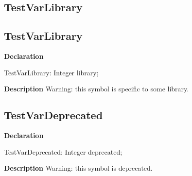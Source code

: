 \documentclass{report}
\newif\ifpdf
\begin{document}
\subsection*{\large{\textbf{TestVarLibrary}}\normalsize\hspace{1ex}\hrulefill}
\else
\subsection*{TestVarLibrary}
\fi
\label{ok_hint_directives-TestVarLibrary}
\begin{list}{}{
\setlength{\itemindent}{0cm}
\setlength{\listparindent}{0cm}
\setlength{\leftmargin}{\evensidemargin}
\addtolength{\leftmargin}{\tmplength}
\settowidth{\labelsep}{X}
\addtolength{\leftmargin}{\labelsep}
\setlength{\labelwidth}{\tmplength}
}
\item[\textbf{Declaration}\hfill]
\ifpdf
\begin{flushleft}
\fi
\begin{ttfamily}
TestVarLibrary: Integer library;\end{ttfamily}

\ifpdf
\end{flushleft}
\fi

\par
\item[\textbf{Description}]
Warning: this symbol is specific to some library.

 

\end{list}
\ifpdf
\subsection*{\large{\textbf{TestVarDeprecated}}\normalsize\hspace{1ex}\hrulefill}
\else
\subsection*{TestVarDeprecated}
\fi
\label{ok_hint_directives-TestVarDeprecated}
\begin{list}{}{
\setlength{\itemindent}{0cm}
\setlength{\listparindent}{0cm}
\setlength{\leftmargin}{\evensidemargin}
\addtolength{\leftmargin}{\tmplength}
\settowidth{\labelsep}{X}
\addtolength{\leftmargin}{\labelsep}
\setlength{\labelwidth}{\tmplength}
}
\item[\textbf{Declaration}\hfill]
\ifpdf
\begin{flushleft}
\fi
\begin{ttfamily}
TestVarDeprecated: Integer deprecated;\end{ttfamily}

\ifpdf
\end{flushleft}
\fi

\par
\item[\textbf{Description}]
Warning: this symbol is deprecated.

 

\end{list}
\ifpdf
\end{document}
